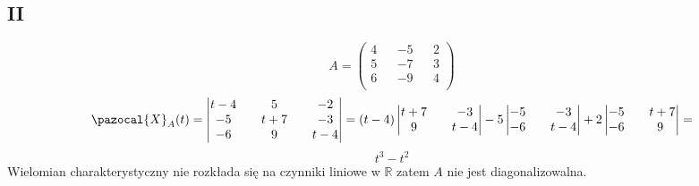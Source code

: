 \documentclass{article}
\begin{document}
\subsection*{II}
$$
A=
\begin{pmatrix}
4 && -5 && 2\\
5 && -7 && 3\\
6 && -9 && 4\\
\end{pmatrix}
$$
$$
\pazocal{X}_A(t) =
\begin{vmatrix}
t-4 && 5 && -2\\
-5 && t+7 && -3\\
-6 && 9 && t-4\\
\end{vmatrix}
=
(t-4)
\begin{vmatrix}
t+7 && -3\\
9 && t-4\\
\end{vmatrix}
-5
\begin{vmatrix}
-5 && -3\\
-6 && t-4\\
\end{vmatrix}
+2
\begin{vmatrix}
-5 && t+7\\
-6 && 9\
\end{vmatrix} =
$$
$$
t^3  - t^2
$$
Wielomian charakterystyczny nie rozkłada się na czynniki liniowe w $\mathbb{R}$ zatem $A$ nie jest diagonalizowalna.
\\\\\\\\\\\\\\\\\\\\\\\\\\\\\\
\end{document}
